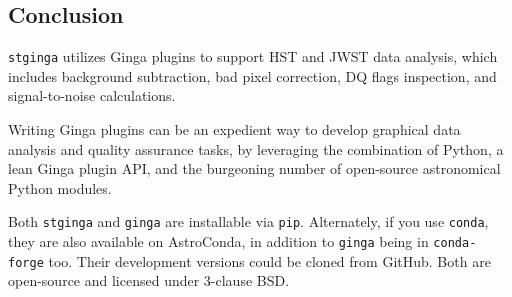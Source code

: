 \documentclass[]{article}
\begin{document}
\begin{multicols}{3}
\section*{Conclusion}

{\tt stginga} utilizes Ginga plugins to support HST and JWST data analysis,
which includes background subtraction, bad pixel correction, DQ flags
inspection, and signal-to-noise calculations.

\para
Writing Ginga plugins can be an expedient way to develop graphical data
analysis and quality assurance tasks, by leveraging the combination of
Python, a lean Ginga plugin API, and the burgeoning number of open-source
astronomical Python modules.

\para
Both {\tt stginga} and {\tt ginga} are installable via {\tt pip}. Alternately,
if you use {\tt conda}, they are also available on AstroConda\cite{astroconda},
in addition to {\tt ginga} being in  {\tt conda-forge} too. Their development
versions could be cloned from GitHub. Both are open-source and licensed under
3-clause BSD.




\end{multicols}
\end{document}
